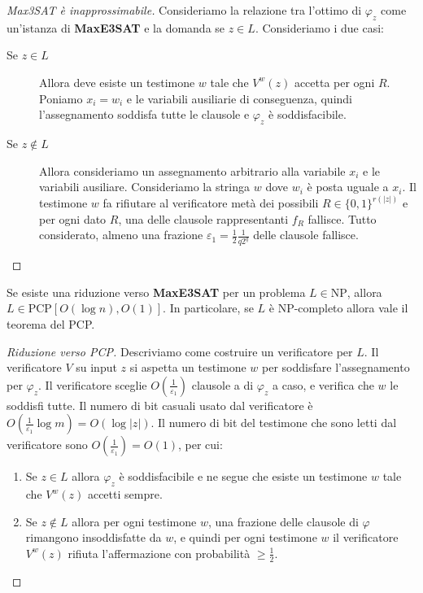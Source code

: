 \documentclass[\main/main.tex]{subfiles}
\begin{document}
\begin{proof}[Max3SAT è inapprossimabile]
    Consideriamo la relazione tra l'ottimo di \(\varphi_z\) come un'istanza di \textbf{MaxE3SAT} e la domanda se \(z \in L\). Consideriamo i due casi:
    \begin{description}
        \item[Se \(z \in L\)] Allora deve esiste un testimone \(w\) tale che \(V^{w}(z)\) accetta per ogni \(R\). Poniamo \(x_i = w_i\) e le variabili ausiliarie di conseguenza, quindi l'assegnamento soddisfa tutte le clausole e \(\varphi_z\) è soddisfacibile. 
        \item[Se \(z \not\in L\)] Allora consideriamo un assegnamento arbitrario alla variabile \(x_i\) e le variabili ausiliare. Consideriamo la stringa \(w\) dove \(w_i\) è posta uguale a \(x_i\). Il testimone \(w\) fa rifiutare al verificatore metà dei possibili \(R \in \{0,1\}^{r(|z|)}\) e per ogni dato \(R\), una delle clausole rappresentanti \(f_R\) fallisce. Tutto considerato, almeno una frazione \(\varepsilon_{1}=\frac{1}{2} \frac{1}{q 2^{q}}\) delle clausole fallisce.
    \end{description}
\end{proof}
\begin{theorem}
    Se esiste una riduzione verso \textbf{MaxE3SAT} per un problema \(L \in \mathrm{NP}\), allora \(L \in \mathrm{PCP}[O(\log n), O(1)]\). In particolare, se \(L\) è \(\mathrm{NP}\)-completo allora vale il teorema del PCP.
\end{theorem}
\begin{proof}[Riduzione verso PCP]
    Descriviamo come costruire un verificatore per \(L\). Il verificatore \(V\) su input \(z\) si aspetta un testimone \(w\) per soddisfare l'assegnamento per \(\varphi_z\). Il verificatore sceglie \(O\left(\frac{1}{\varepsilon_{1}}\right)\) clausole a di \(\varphi_z\) a caso, e verifica che \(w\) le soddisfi tutte. Il numero di bit casuali usato dal verificatore è \(O\left(\frac{1}{\varepsilon_{1}} \log m\right)=O(\log |z|)\). Il numero di bit del testimone che sono letti dal verificatore sono \(O\left(\frac{1}{\varepsilon_{1}}\right)=O(1)\), per cui:
    \begin{enumerate}
         \item Se \(z \in L\) allora \(\varphi_z\) è soddisfacibile e ne segue che esiste un testimone \(w\) tale che \(V^{w}(z)\) accetti sempre.
         \item Se \(z \not\in L\) allora per ogni testimone \(w\), una frazione delle clausole di \(\varphi\) rimangono insoddisfatte da \(w\), e quindi per ogni testimone \(w\) il verificatore \(V^{w}(z)\) rifiuta l'affermazione con probabilità \(\geq \frac{1}{2}\).
    \end{enumerate}
\end{proof}
\clearpage
\end{document}
